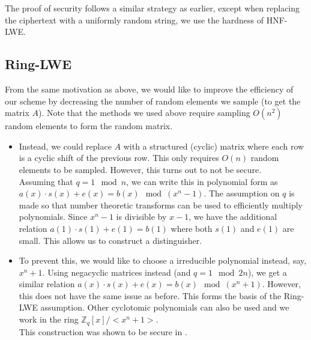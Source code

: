 \documentclass[12pt]{tufte-book}
\begin{document}
The proof of security follows a similar strategy as earlier, except when replacing the ciphertext with a uniformly random string, we use the hardness of HNF-LWE.

\subsection{Ring-LWE}
From the same motivation as above, we would like to improve the efficiency of our scheme by decreasing the number of random elements we sample (to get the matrix $A$). Note that the methods we used above require sampling $O(n^2)$ random elements to form the random matrix. 
\begin{itemize}
    \item Instead, we could replace $A$ with a structured (cyclic) matrix where each row is a cyclic shift of the previous row. This only requires $O(n)$ random elements to be sampled. However, this turns out to not be secure. \\
    Assuming that $q = 1 \mod n$, we can write this in polynomial form as $a(x) \cdot s(x) + e(x) = b(x) \mod (x^n - 1)$. The assumption on $q$ is made so that number theoretic transforms can be used to efficiently multiply polynomials. Since $x^n - 1$ is divisible by $x-1$, we have the additional relation $a(1) \cdot s(1) + e(1) = b(1)$ where both $s(1)$ and $e(1)$ are small. This allows us to construct a distinguisher.

    \item To prevent this, we would like to choose a irreducible polynomial instead, say, $x^n + 1$. Using negacyclic matrices instead (and $q = 1 \mod 2n$), we get a similar relation $a(x) \cdot s(x) + e(x) = b(x) \mod (x^n + 1)$. However, this does not have the same issue as before. This forms the basis of the Ring-LWE assumption. Other cyclotomic polynomials can also be used and we work in the ring $\mathbb{Z}_q[x]/<x^n + 1>$. \\
    This construction was shown to be secure in \cite{EC:LyuPeiReg10}.
\end{itemize}
\end{document}
